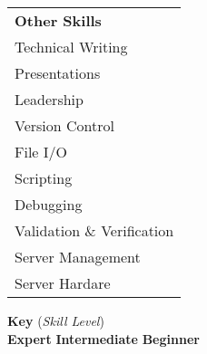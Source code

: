 \begin{minipage}{0.25\textwidth}
	\begin{center} 
\begin{tabular}{l}
	{\large\textbf{Other Skills}} \\
	\highskillbw Technical Writing \\
	\highskillbw Presentations \\
	\highskillbw Leadership \\
	\highskillbw Version Control \\
	\highskillbw File I/O \\ 
	\highskillbw Scripting \\ 
	\medskillbw Debugging \\
	\medskillbw Validation \& Verification \\
	\lowskillbw Server Management \\
	\lowskillbw Server Hardare \\
\end{tabular}
	\end{center}
\end{minipage}%
%
%

\begin{center}
\begin{minipage}{0.6\textwidth}
	\begin{center}{\large\textbf{Key}} (\textit{Skill Level}) \\ 
	\highskillbw \textbf{Expert}
	\medskillbw \textbf{Intermediate}
	\lowskillbw \textbf{Beginner} 
	\end{center}
\end{minipage}
\end{center}
